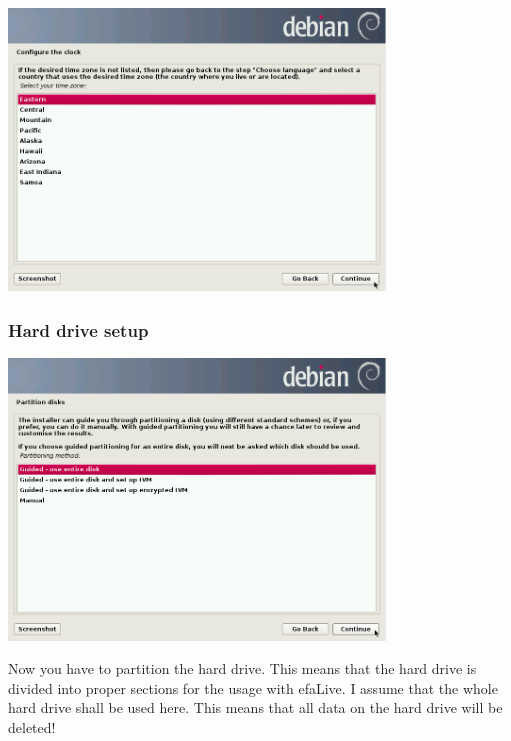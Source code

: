\documentclass[a4paper,12pt,twoside]{article}
\begin{document}
\bigskip
\begin{minipage}{\linewidth}
    \centering
    \includegraphics[width=10cm]{efaLiveen-img/efaLiveen-img9.png}
    \label{fig:inst_timezone}
\end{minipage}


\subsubsection{Hard drive setup}
\label{sct:inst_harddrive}

\begin{minipage}{\linewidth}
    \centering
    \includegraphics[width=10cm]{efaLiveen-img/efaLiveen-img10.png}
    \label{fig:partitioning}
\end{minipage}
\bigskip

Now you have to partition the hard drive. This means that the hard drive
is divided into proper sections for the usage with efaLive. I assume
that the whole hard drive shall be used here. This means that all data
on the hard drive will be deleted!
\end{document}
